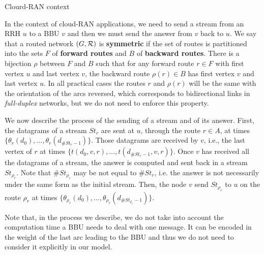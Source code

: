 \documentclass[10pt]{article}
\begin{document}
      \begin{subsubsection}{Clourd-RAN context}
     
      In the context of cloud-RAN applications, we need to send a stream from an RRH $u$ to a BBU $v$ and then 
      we must send the answer from $v$ back to $u$. We say that a routed network $(G, {\cal R})$ is \textbf{symmetric} if the set of routes is partitioned into the sets $F$ of \textbf{forward routes} and $B$ of \textbf{backward routes}. There is a bijection $\rho$ between $F$ and $B$ such that for any forward route $r \in F$ with first vertex $u$ and last vertex $v$, the backward route $\rho(r) \in B$ has first vertex $v$ and last vertex $u$. In all practical cases the routes $r$ and $\rho(r)$ will be the same with the orientation of the arcs reversed, which corresponds to bidirectional links in \emph{full-duplex} networks, but we do not need to enforce this property.
      
     We now describe the process of the sending of a stream and of its answer. First, the datagrams of a stream $St_r$ are sent at $u$, through the route $r \in A$, at times $\{\theta_r(d_0),\ldots,\theta_r(d_{\#St_r-1}) \}$.
      Those datagrams are received by $v$, i.e., the last vertex of $r$ at times $\{t(d_0,v,r),\ldots,t(d_{\#St_r-1},v,r)\}$. 
     Once $v$ has received all the datagrams of a stream, the answer is computed and sent back in a stream $St_{\rho_r}$. Note that $\#St_{\rho_r}$ may be not equal to $\#St_r$, i.e. the answer is not necessarily under the same form as the initial stream. Then, the node $v$ send $St_{\rho_r}$ to  $u$ on the route $\rho_r$ at times $\{\theta_{\rho_r}(d_0),\ldots,\theta_{\rho_r}(d_{\#St_{\rho_r}-1}) \}$.
     

     Note that, in the process we describe, we do not take into account the computation time a BBU needs to deal with one message. It can be encoded in the weight of the last arc leading to the BBU and thus we do not need to consider it explicitly in our model. 

     \end{subsubsection}
\end{document}
